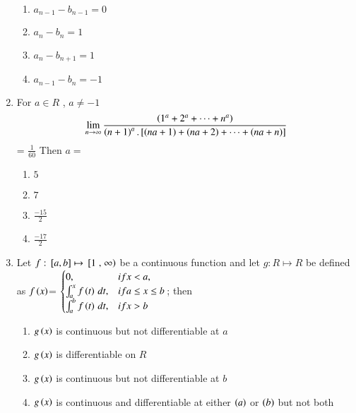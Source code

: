 \documentclass[journal,12pt,twocolumn]{IEEEtran}
\theoremstyle{remark}
\begin{document}
\begin{enumerate}
    \begin{enumerate}[label=(\alph*)]
        
        \item $a_{n-1}-b_{n-1}=0$ 
        \item $a_n-b_n=1$ 
        \item $a_n-b_{n+1}=1$ 
        \item $a_{n-1}-b_n=-1$ 
    \end{enumerate}


    \item 
    For $a\in R$ , $a\neq -1$ 
    \begin{align*}
	    \lim_{n\to\infty}\frac{\left(1^a+2^a+\cdots+n^a\right)}{\left(n+1\right)^a.{}\left[\left(na+1\right)+\left(na+2\right)+\cdots+\left(na+n\right)\right]}
    \end{align*} = $\frac{1}{60}$ Then $a=$

    \hfill 
    {}
    
    \begin{enumerate}[label=(\alph*)]
        
        \item $5$
        \item $7$ 
        \item $\frac{-15}{2}$ 
        \item $\frac{-17}{2}$ 
    \end{enumerate}


    \item 
    Let $f: {}\left[a,b\right]\mapsto {}\left[1\right.,\left.\infty\right)$ be a continuous function and let $g: R\mapsto R$ be defined as 
    $f\left(x\right)$= 
    $\begin{cases}
       0, & if x<a, \\
       \int_{a}^{x}{f\left(t\right) \, dt}, & if a\leq x\leq b \\
       \int_{a}^{b}{f\left(t\right) \, dt}, & if x>b
    \end{cases}$; then 

    \hfill 
    {}
    
    \begin{enumerate}[label=(\alph*)]
        
        \item $g\left(x\right)$ is continuous but not differentiable at $a$
        \item $g\left(x\right)$ is differentiable on $R$
        \item $g\left(x\right)$ is continuous but not differentiable at $b$
        \item $g\left(x\right)$ is continuous and differentiable at either $\left(a\right)$ or $\left(b\right)$ but not both 
    \end{enumerate}



\end{enumerate}
\end{document}
